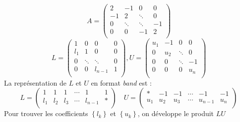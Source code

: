 \documentclass{article}
\begin{document}
\[
	A = 
	\begin{pmatrix}
			2	& 	-1	&	0	& 0	\\
			-1	&	2	&\ddots	& 0	\\
			0	& \ddots&\ddots	&-1	\\
			0	& 	0	& -1 	& 2	\\
	\end{pmatrix}
\]
\[
	L = 
	\begin{pmatrix}
			1	& 	0	&	0	& 0	\\
			l_1	&	1	&	0	& 0	\\
			0	& \ddots&\ddots	& 0	\\
			0	& 	0	& l_{n-1} 	& 1	\\
	\end{pmatrix},
	U = 
	\begin{pmatrix}
			u_1	& 	-1	&	0	& 0	\\
			0	&	u_2	&\ddots	& 0	\\
			0	& 	0	&\ddots	& -1\\
			0	& 	0	& 0 	& u_n	\\
	\end{pmatrix}
\]
La représentation de $L$ et $U$ en format \textit{band} est :
\[
	L = 
	\begin{pmatrix}
		1	& 	1	&	1	&	\cdots	&	1		&	1	\\
		l_1	& 	l_2	&	l_3	&	\cdots	&	l_{n-1}	&	\ast	\\
	\end{pmatrix}
	\quad
	U = 
	\begin{pmatrix}
		\ast& 	-1	&	-1	&	\cdots	&	-1		&	-1	\\
		u_1	& 	u_2	&	u_3	&	\cdots	&	u_{n-1}	&	u_n	\\
	\end{pmatrix}
\]
Pour trouver les coefficients $\left\lbrace l_k \right\rbrace$ et $\left\lbrace u_k \right\rbrace$, on développe le produit $LU$
\end{document}
